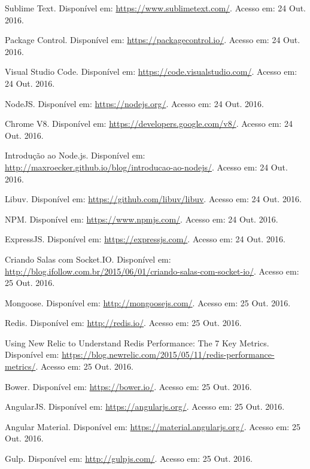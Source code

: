\documentclass[brazil,ruledheader]{abntifes}
\begin{document}
\begin{thebibliography}{9}
		Sublime Text. Disponível em: \url{https://www.sublimetext.com/}.
		Acesso em: 24 Out. 2016.
		
		Package Control. Disponível em: \url{https://packagecontrol.io/}.
		Acesso em: 24 Out. 2016.
		
		Visual Studio Code. Disponível em: \url{https://code.visualstudio.com/}.
		Acesso em: 24 Out. 2016.
		
		NodeJS. Disponível em: \url{https://nodejs.org/}.
		Acesso em: 24 Out. 2016.
		
		Chrome V8. Disponível em: \url{https://developers.google.com/v8/}.
		Acesso em: 24 Out. 2016.
		
		Introdução ao Node.js. Disponível em: \url{http://maxroecker.github.io/blog/introducao-ao-nodejs/}.
		Acesso em: 24 Out. 2016.
		
		Libuv. Disponível em: \url{https://github.com/libuv/libuv}.
		Acesso em: 24 Out. 2016.
		
		NPM. Disponível em: \url{https://www.npmjs.com/}.
		Acesso em: 24 Out. 2016.
		
		ExpressJS. Disponível em: \url{https://expressjs.com/}.
		Acesso em: 24 Out. 2016.
		
		Criando Salas com Socket.IO. Disponível em: \url{http://blog.ifollow.com.br/2015/06/01/criando-salas-com-socket-io/}.
		Acesso em: 25 Out. 2016.
		
		Mongoose. Disponível em: \url{http://mongoosejs.com/}.
		Acesso em: 25 Out. 2016.
		
		Redis. Disponível em: \url{http://redis.io/}.
		Acesso em: 25 Out. 2016.
		
		Using New Relic to Understand Redis Performance: The 7 Key Metrics. Disponível em: \url{https://blog.newrelic.com/2015/05/11/redis-performance-metrics/}.
		Acesso em: 25 Out. 2016.
		
		Bower. Disponível em: \url{https://bower.io/}.
		Acesso em: 25 Out. 2016.
		
		AngularJS. Disponível em: \url{https://angularjs.org/}.
		Acesso em: 25 Out. 2016.
		
		Angular Material. Disponível em: \url{https://material.angularjs.org/}.
		Acesso em: 25 Out. 2016.
		
		Gulp. Disponível em: \url{http://gulpjs.com/}.
		Acesso em: 25 Out. 2016.
		

\end{thebibliography}
\end{document}
